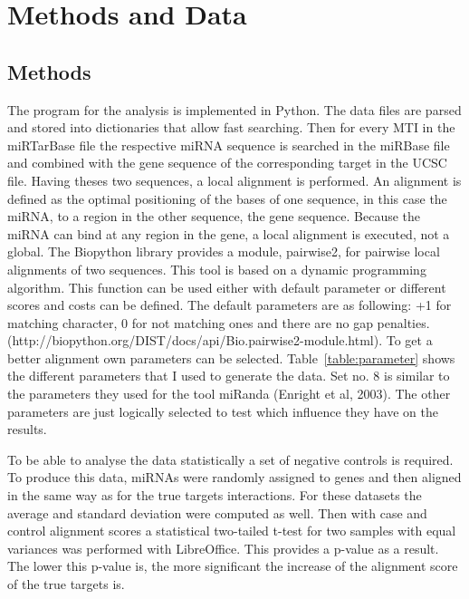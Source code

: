 \documentclass[12pt]{article}
\begin{document}
\section{Methods and Data}
\subsection{Methods}
The program for the analysis is implemented in Python. The data files are parsed and stored into dictionaries that allow fast searching. Then for every MTI in the miRTarBase file the respective miRNA sequence is searched in the miRBase file and combined with the gene sequence of the corresponding target in the UCSC file. Having theses two sequences, a local alignment is performed. An alignment is defined as the optimal positioning of the bases of one sequence, in this case the miRNA, to a region in the other sequence, the gene sequence. Because the miRNA can bind at any region in the gene, a local alignment is executed, not a global. The Biopython library provides a module, pairwise2, for pairwise local alignments of two sequences. This tool is based on a dynamic programming algorithm. This function can be used either with default parameter or different scores and costs can be defined. The default parameters are as following: +1 for matching character, 0 for not matching ones and there are no gap penalties. (http://biopython.org/DIST/docs/api/Bio.pairwise2-module.html). To get a better alignment own parameters can be selected. Table~\ref{table:parameter} shows the different parameters that I used to generate the data. Set no. 8 is similar to the parameters they used for the tool miRanda (Enright et al, 2003). The other parameters are just logically selected to test which influence they have on the results. 

To be able to analyse the data statistically a set of negative controls is required. To produce this data, miRNAs were randomly assigned to genes and then aligned in the same way as for the true targets interactions. For these datasets the average and standard deviation were computed as well. Then with case and control alignment scores a statistical two-tailed t-test for two samples with equal variances was performed with LibreOffice. This provides a p-value as a result. The lower this p-value is, the more significant the increase of the alignment score of the true targets is.
\end{document}
